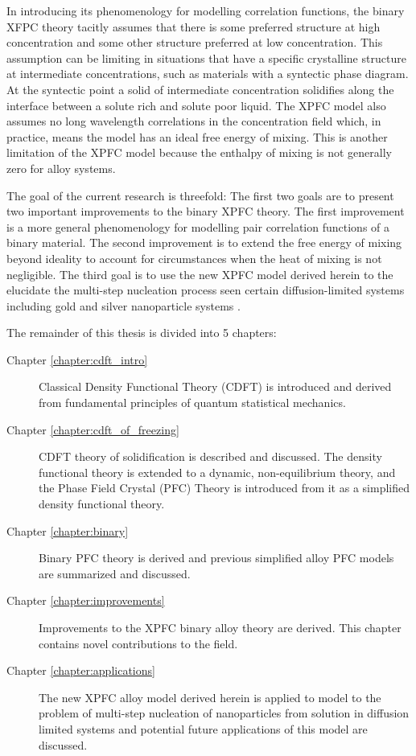 
In introducing its phenomenology for modelling correlation functions, the
binary XFPC theory tacitly assumes that there is some preferred structure at
high concentration and some other structure preferred at low concentration.
This assumption can be limiting in situations that have a specific crystalline
structure at intermediate concentrations, such as materials with a syntectic
phase diagram. At the syntectic point a solid of intermediate concentration
solidifies along the interface between a solute rich and solute poor liquid.
The XPFC model also assumes no long wavelength correlations in the
concentration field which, in practice, means the model has an ideal free
energy of mixing.  This is another limitation of the XPFC model because the
enthalpy of mixing is not generally zero for alloy systems.


The goal of the current research is threefold: The first two goals are
to present two important improvements to the binary XPFC theory. The first 
improvement is a more general phenomenology for modelling pair correlation 
functions of a binary material. The second improvement is to extend the free energy 
of mixing beyond ideality to account for circumstances when the heat of mixing 
is not negligible. The third goal is to use the new XPFC model derived herein
to the elucidate the multi-step nucleation process seen certain
diffusion-limited systems including gold and silver nanoparticle systems
\cite{LOH17}.


The remainder of this thesis is divided into 5 chapters:
%
\begin{description}
    \item [Chapter \ref{chapter:cdft_intro}] { Classical Density Functional
        Theory (CDFT) is introduced and derived from fundamental principles of
        quantum statistical mechanics.
    }
    \item [Chapter \ref{chapter:cdft_of_freezing}] { CDFT theory of
        solidification is described and discussed. The density functional
        theory is extended to a dynamic, non-equilibrium theory, and the Phase
        Field Crystal (PFC) Theory is introduced from it as a simplified
        density functional theory.
    }
    \item [Chapter \ref{chapter:binary}] {Binary PFC theory is derived and
        previous simplified alloy PFC models are summarized and discussed.
    }
    \item [Chapter \ref{chapter:improvements}] {Improvements to the XPFC binary
        alloy theory are derived. This chapter contains novel contributions to
        the field.
    }
    \item [Chapter \ref{chapter:applications}] {The new XPFC alloy model
        derived herein is applied to model to the problem of multi-step
        nucleation of nanoparticles from solution in diffusion limited systems
        and potential future applications of this model are discussed.
    } 
\end{description}
%

